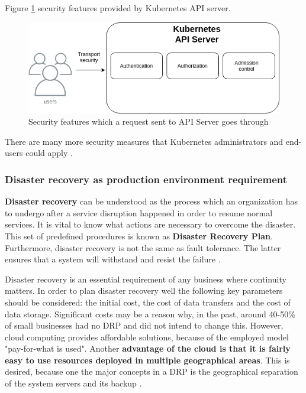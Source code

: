 Figure \ref{fig:security-api-server} security features provided by Kubernetes API server.
\begin{figure}[H]
    \centering
    \includegraphics[width=13cm]{figures/api-server-security.png}
    \caption{Security features which a request sent to API Server goes through \cite{k8s-sec}}
    \label{fig:security-api-server}
\end{figure}

There are many more security measures that Kubernetes administrators and end-users could apply \cite{book-cndwk, book-mastering-k8s}.

\subsubsection{Disaster recovery as production environment requirement}
\textbf{Disaster recovery} can be understood as the process which an organization has to undergo after a service  disruption happened in order to resume normal services. It is vital to know what actions are necessary to overcome the disaster. This set of predefined procedures is known as \textbf{Disaster Recovery Plan}. Furthermore, disaster recovery is not the same as fault tolerance. The latter ensures that a system will withstand and resist the failure \cite{article-dr}.

Disaster recovery is an essential requirement of any business where continuity matters. In order to plan disaster recovery well the following key parameters should be considered: the initial cost, the cost of data transfers and the cost of data storage. Significant costs may be a reason why, in the past, around 40-50\% of small businesses had no DRP and did not intend to change this. However, cloud computing provides affordable solutions, because of the employed model "pay-for-what is used". Another \textbf{advantage of the cloud is that it is fairly easy to use resources deployed in multiple geographical areas}. This is desired, because one the major concepts in a DRP is the geographical separation of the system servers and its backup \cite{article-dr-cloud}.

